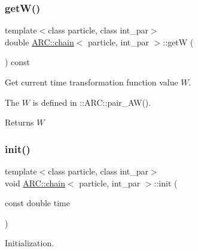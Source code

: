 \subsubsection{\texorpdfstring{get\+W()}{getW()}}
{\footnotesize\ttfamily template$<$class particle, class int\+\_\+par$>$ \\
double \hyperlink{classARC_1_1chain}{A\+R\+C\+::chain}$<$ particle, int\+\_\+par $>$\+::getW (\begin{DoxyParamCaption}{ }\end{DoxyParamCaption}) const\hspace{0.3cm}{\ttfamily [inline]}}



Get current time transformation function value $W$. 

The $W$ is defined in \+::\+A\+R\+C\+::pair\+\_\+\+A\+W(). \begin{DoxyReturn}{Returns}
$W$ 
\end{DoxyReturn}
\hypertarget{classARC_1_1chain_a3fe37720ceb48c14905c92d3e25e71a4}{}\label{classARC_1_1chain_a3fe37720ceb48c14905c92d3e25e71a4} 
\subsubsection{\texorpdfstring{init()}{init()}}
{\footnotesize\ttfamily template$<$class particle, class int\+\_\+par$>$ \\
void \hyperlink{classARC_1_1chain}{A\+R\+C\+::chain}$<$ particle, int\+\_\+par $>$\+::init (\begin{DoxyParamCaption}\item[{const double}]{time }\end{DoxyParamCaption})\hspace{0.3cm}{\ttfamily [inline]}}



Initialization. 


